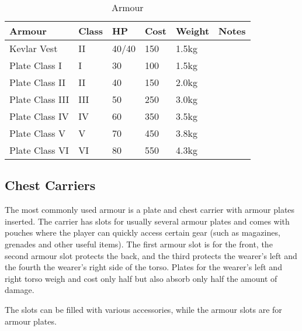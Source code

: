 \begin{table}
  \caption{Armour}
  \label{tab:Armour}
  \begin{center}
    \begin{tabular}{| l | l | l | l | l | l |}

      \hline
      \textbf{Armour} & \textbf{Class} & \textbf{HP} &
      \textbf{Cost} & \textbf{Weight} & \textbf{Notes} \\ \hline

      Kevlar Vest     &  II & 40/40 & 150 & 1.5kg & \\ \hline
      Plate Class I   &   I & 30    & 100 & 1.5kg & \\ \hline
      Plate Class II  &  II & 40    & 150 & 2.0kg & \\ \hline
      Plate Class III & III & 50    & 250 & 3.0kg & \\ \hline
      Plate Class IV  &  IV & 60    & 350 & 3.5kg & \\ \hline
      Plate Class V   &   V & 70    & 450 & 3.8kg & \\ \hline
      Plate Class VI  &  VI & 80    & 550 & 4.3kg & \\ \hline

    \end{tabular}
  \end{center}
\end{table}

\subsection{Chest Carriers}
\label{sub:10-Chest Carriers}

The most commonly used armour is a plate and chest carrier with armour plates
inserted. The carrier has slots for usually several armour plates and comes
with pouches where the player can quickly access certain gear (such as
magazines, grenades and other useful items). The first armour slot is for the
front, the second armour slot protects the back, and the third protects the
wearer's left and the fourth the wearer's right side of the torso. Plates for
the wearer's left and right torso weigh and cost only half but also absorb only
half the amount of damage.


The slots can be filled with various accessories, while the armour slots are
for armour plates.

